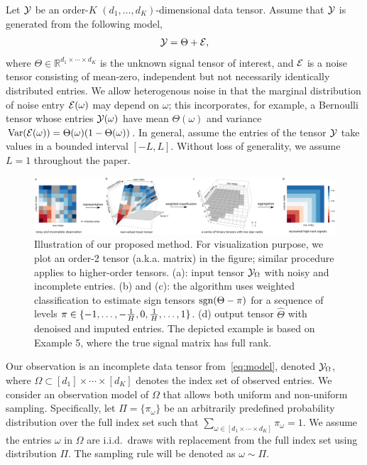 \documentclass{article}
\theoremstyle{plain}
\theoremstyle{definition}
\def\sign{\textup{sgn}}
\begin{document}
Let $\mathcal{Y}$ be an order-$K$ $(d_1,\ldots,d_K)$-dimensional data tensor. Assume that $\mathcal{Y}$ is generated from the following model,
\begin{equation}\label{eq:model}
\mathcal{Y}=\Theta+\mathcal{E},
\end{equation}
where $\Theta\in\mathbb{R}^{d_1\times \cdots \times d_K}$ is the unknown signal tensor of interest, and $\mathcal{E}$ is a noise tensor consisting of mean-zero, independent but not necessarily identically distributed entries. We allow heterogenous noise in that the marginal distribution of noise entry $\mathcal{E}(\omega)$ may depend on $\omega$; this incorporates, for example, a Bernoulli tensor whose entries $\mathcal{Y}(\omega)$ have mean $\Theta(\omega)$ and variance $\text{Var}(\mathcal{E}(\omega))=\Theta(\omega)(1-\Theta(\omega))$. In general, assume the entries of the tensor $\mathcal{Y}$ take values in a bounded interval $[-L, L]$. Without loss of generality, we assume $L=1$ throughout the paper. 

\begin{figure}[h!]
\centerline{\includegraphics[width=1\textwidth]{image_new2.pdf}}
\caption{Illustration of our proposed method. For visualization purpose, we plot an order-2 tensor (a.k.a. matrix) in the figure; similar procedure applies to higher-order tensors. (a): input tensor $\mathcal{Y}_\Omega$ with noisy and incomplete entries. (b) and (c): the algorithm uses weighted classification to estimate sign tensors $\sign(\Theta-\pi)$ for a sequence of levels $\pi\in \{-1,\ldots,-{1\over H},0,{1\over H},\ldots,1\}$. (d) output tensor $\hat \Theta$ with denoised and imputed entries. The depicted example is based on Example 5, where the true signal matrix has full rank. }\label{fig:demo}
\end{figure}

Our observation is an incomplete data tensor from~\eqref{eq:model}, denoted $\mathcal{Y}_\Omega$, where $\Omega\subset[d_1]\times\cdots\times[d_K]$ denotes the index set of observed entries. We consider an observation model of $\Omega$ that allows both uniform and non-uniform sampling. Specifically, let $\Pi=\{\pi_\omega\}$ be an arbitrarily predefined probability distribution over the full index set such that $\sum_{\omega\in[d_1\times \cdots \times d_K]}\pi_\omega=1$. We assume the entries $\omega$ in $\Omega$ are i.i.d.\ draws with replacement from the full index set using distribution $\Pi$. The sampling rule will be denoted as $\omega\sim \Pi$.
\end{document}
